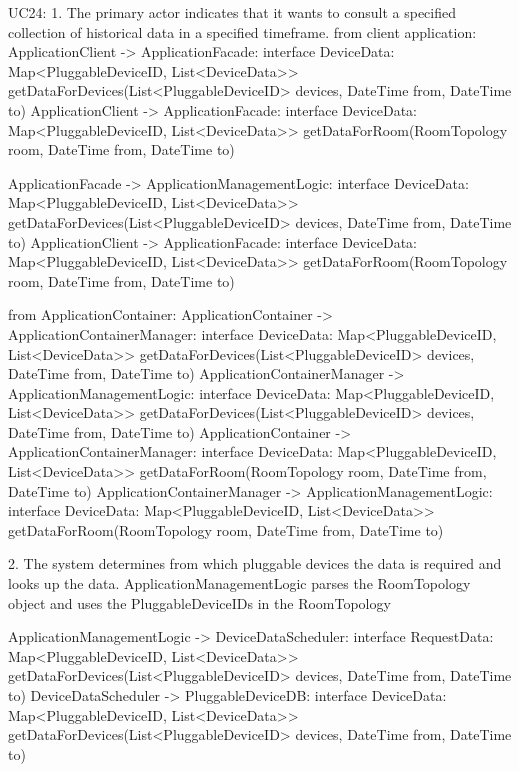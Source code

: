         UC24:
            1. The primary actor indicates that it wants to consult a specified collection of historical data in a specified timeframe.
                from client application:
                    ApplicationClient -> ApplicationFacade: interface DeviceData: Map<PluggableDeviceID, List<DeviceData>> getDataForDevices(List<PluggableDeviceID> devices, DateTime from, DateTime to)
                    ApplicationClient -> ApplicationFacade: interface DeviceData: Map<PluggableDeviceID, List<DeviceData>> getDataForRoom(RoomTopology room, DateTime from, DateTime to)

                    ApplicationFacade -> ApplicationManagementLogic: interface DeviceData: Map<PluggableDeviceID, List<DeviceData>> getDataForDevices(List<PluggableDeviceID> devices, DateTime from, DateTime to)
                    ApplicationClient -> ApplicationFacade: interface DeviceData: Map<PluggableDeviceID, List<DeviceData>> getDataForRoom(RoomTopology room, DateTime from, DateTime to)

                from ApplicationContainer:
                    ApplicationContainer -> ApplicationContainerManager: interface DeviceData: Map<PluggableDeviceID, List<DeviceData>> getDataForDevices(List<PluggableDeviceID> devices, DateTime from, DateTime to)
                    ApplicationContainerManager -> ApplicationManagementLogic: interface DeviceData: Map<PluggableDeviceID, List<DeviceData>> getDataForDevices(List<PluggableDeviceID> devices, DateTime from, DateTime to)
                    ApplicationContainer -> ApplicationContainerManager: interface DeviceData: Map<PluggableDeviceID, List<DeviceData>> getDataForRoom(RoomTopology room, DateTime from, DateTime to)
                    ApplicationContainerManager -> ApplicationManagementLogic: interface DeviceData: Map<PluggableDeviceID, List<DeviceData>> getDataForRoom(RoomTopology room, DateTime from, DateTime to)


            2. The system determines from which pluggable devices the data is required and looks up the data.
                ApplicationManagementLogic parses the RoomTopology object and uses the PluggableDeviceIDs in the RoomTopology

                    ApplicationManagementLogic -> DeviceDataScheduler: interface RequestData: Map<PluggableDeviceID, List<DeviceData>> getDataForDevices(List<PluggableDeviceID> devices, DateTime from, DateTime to)
                    DeviceDataScheduler -> PluggableDeviceDB: interface DeviceData: Map<PluggableDeviceID, List<DeviceData>> getDataForDevices(List<PluggableDeviceID> devices, DateTime from, DateTime to)

